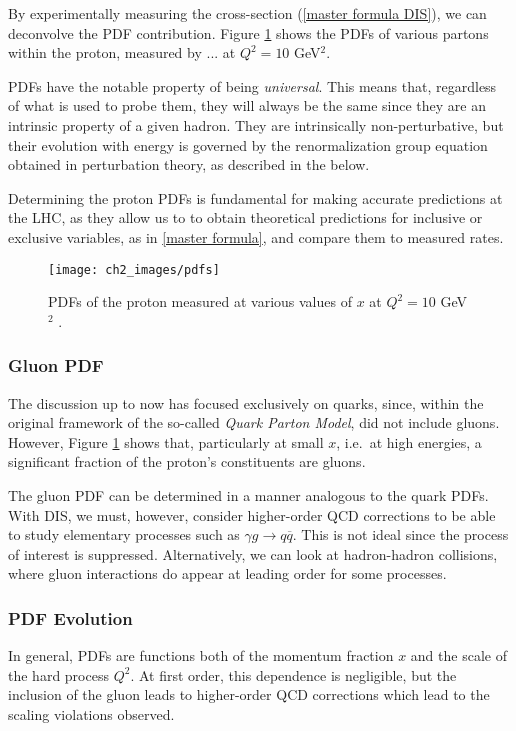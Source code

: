 \documentclass[10pt,a4paper]{book}
\begin{document}
By experimentally measuring the cross-section (\ref{master formula DIS}), we can deconvolve the PDF contribution. Figure \ref{PDF plot} shows the PDFs of various partons within the proton, measured by ... at $Q^2 = 10$ GeV$^2$. 

PDFs have the notable property of being \emph{universal}. This means that, regardless of what is used to probe them, they will always be the same since they are an intrinsic property of a given hadron. They are intrinsically non-perturbative, but their evolution with energy is governed by the renormalization group equation obtained in perturbation theory, as described in the below. 

Determining the proton PDFs is fundamental for making accurate predictions at the LHC, as they allow us to to obtain theoretical predictions for inclusive or exclusive variables, as in \ref{master formula}, and compare them to measured rates. 
\begin{figure}[h!]
\centering
\texttt{[image: ch2\_images/pdfs]}
\caption{PDFs of the proton measured at various values of $x$ at $Q^2 = 10$ GeV$^2$ \cite{Metcalfe}.}
\label{PDF plot}
\end{figure}

\subsubsection{Gluon PDF}

The discussion up to now has focused exclusively on quarks, since, within the original framework of the so-called \emph{Quark Parton Model}, did not include gluons. However, Figure \ref{PDF plot} shows that, particularly at small $x$, i.e.\ at high energies, a significant fraction of the proton's constituents are gluons.

The gluon PDF can be determined in a manner analogous to the quark PDFs. With DIS, we must, however, consider higher-order QCD corrections to be able to study elementary processes such as $\gamma g \rightarrow q \overline{q}$. This is not ideal since the process of interest is suppressed. Alternatively, we can look at hadron-hadron collisions, where gluon interactions do appear at leading order for some processes.

\subsubsection{PDF Evolution}

In general, PDFs are functions both of the momentum fraction $x$ and the scale of the hard process $Q^2$. At first order, this dependence is negligible, but the inclusion of the gluon leads to higher-order QCD corrections which lead to the scaling violations observed. 
\end{document}
